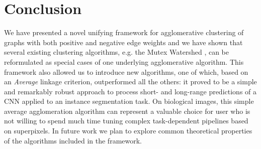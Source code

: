 \section{Conclusion}

We have presented a novel unifying framework for agglomerative clustering of graphs with both positive and negative edge weights and we have shown that several existing clustering algorithms, e.g. the Mutex Watershed \cite{wolf2018mutex}, can be reformulated as special cases of one underlying agglomerative algorithm. This framework also allowed us to introduce new algorithms, one of which, based on an \emph{Average} linkage criterion, outperformed all the others: it proved to be a simple and remarkably robust approach to process short- and long-range predictions of a CNN applied to an instance segmentation task.
On biological images, this simple average agglomeration algorithm can represent a valuable choice for user who is not willing to spend much time tuning complex task-dependent pipelines based on superpixels.  
In future work we plan to explore common theoretical properties of the algorithms included in the framework.
